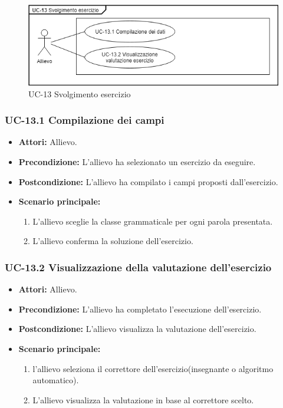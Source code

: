 			\begin{figure}[h]
		\centering
		\includegraphics[scale=0.7]{images/UC-13.png}
		\caption{UC-13 Svolgimento esercizio}
	\end{figure}

	\subsubsection{UC-13.1 Compilazione dei campi}
		\begin{itemize}
			\item \textbf{Attori:} Allievo.
			\item \textbf{Precondizione:} L'allievo ha selezionato un esercizio da eseguire.
			\item \textbf{Postcondizione:} L'allievo ha compilato i campi proposti dall'esercizio.
			\item \textbf{Scenario principale:}
				\begin{enumerate}
					\item L'allievo sceglie la classe grammaticale per ogni parola presentata.
					\item L'allievo conferma la soluzione dell'esercizio.
				\end{enumerate}
		\end{itemize}

	\subsubsection{UC-13.2 Visualizzazione della valutazione dell'esercizio}
	\begin{itemize}
			\item \textbf{Attori:} Allievo.
			\item \textbf{Precondizione:} L'allievo ha completato l'esecuzione dell'esercizio.
			\item \textbf{Postcondizione:} L'allievo visualizza la valutazione dell'esercizio.
			\item \textbf{Scenario principale:}
				\begin{enumerate}
					\item l'allievo seleziona il correttore dell'esercizio(insegnante o algoritmo automatico).
					\item L'allievo visualizza la valutazione in base al correttore scelto.
				\end{enumerate}
			\end{itemize}				
			
